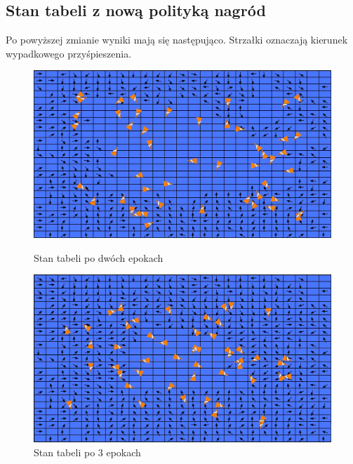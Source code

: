 \documentclass{article}
\begin{document}
\subsection{Stan tabeli z nową polityką nagród} 
Po powyższej zmianie wyniki mają się następująco. Strzałki oznaczają kierunek wypadkowego przyśpieszenia.

\begin{figure}[H]
    \begin{minipage}[h]{0.48\textwidth}
        \centering
        \includegraphics[width=\textwidth]{2_Qtable_after_2nd_epoch.jpg}
        \caption{Stan tabeli po dwóch epokach}
    \end{minipage}
    \hspace{0.02\textwidth}
    \begin{minipage}[h]{0.48\textwidth}
        \centering
        \includegraphics[width=\textwidth]{3_Qtable_after_3rd_epoch.jpg}    
        \caption{Stan tabeli po 3 epokach}
    \end{minipage}
\end{figure}
\end{document}
